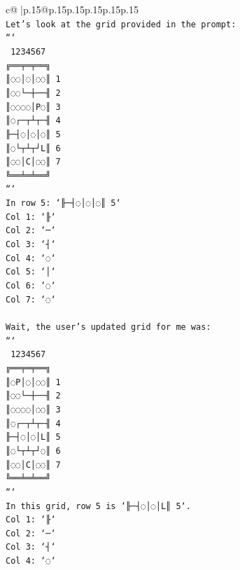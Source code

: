 \documentclass{article}
\begin{document}
{\begin{supertabular}{c@{$\;$}|p{.15\linewidth}@{}p{.15\linewidth}p{.15\linewidth}p{.15\linewidth}p{.15\linewidth}p{.15\linewidth}}
{{{\\ 
\texttt{Let's look at the grid provided in the prompt:} \\
\texttt{```} \\
\texttt{ 1234567} \\
\texttt{╔══╤═╤══╗} \\
\texttt{║◌◌│◌│◌◌║ 1} \\
\texttt{║◌◌└─┼──╢ 2} \\
\texttt{║◌◌◌◌│P◌║ 3} \\
\texttt{║◌┌─┬┴┬─╢ 4} \\
\texttt{╟─┤◌│◌│◌║ 5} \\
\texttt{║◌└┬┴┬┘L║ 6} \\
\texttt{║◌◌│C│◌◌║ 7} \\
\texttt{╚══╧═╧══╝} \\
\texttt{```} \\
\texttt{In row 5: `╟─┤◌│◌│◌║ 5`} \\
\texttt{Col 1: `╟`} \\
\texttt{Col 2: `─`} \\
\texttt{Col 3: `┤`} \\
\texttt{Col 4: `◌`} \\
\texttt{Col 5: `│`} \\
\texttt{Col 6: `◌`} \\
\texttt{Col 7: `◌`} \\
\\ 
\texttt{Wait, the user's updated grid for me was:} \\
\texttt{```} \\
\texttt{ 1234567} \\
\texttt{╔══╤═╤══╗} \\
\texttt{║◌P│◌│◌◌║ 1} \\
\texttt{║◌◌└─┼──╢ 2} \\
\texttt{║◌◌◌◌│◌◌║ 3} \\
\texttt{║◌┌─┬┴┬─╢ 4} \\
\texttt{╟─┤◌│◌│L║ 5} \\
\texttt{║◌└┬┴┬┘◌║ 6} \\
\texttt{║◌◌│C│◌◌║ 7} \\
\texttt{╚══╧═╧══╝} \\
\texttt{```} \\
\texttt{In this grid, row 5 is `╟─┤◌│◌│L║ 5`.} \\
\texttt{Col 1: `╟`} \\
\texttt{Col 2: `─`} \\
\texttt{Col 3: `┤`} \\
\texttt{Col 4: `◌`} \\
}}}
\end{supertabular}}
\end{document}
